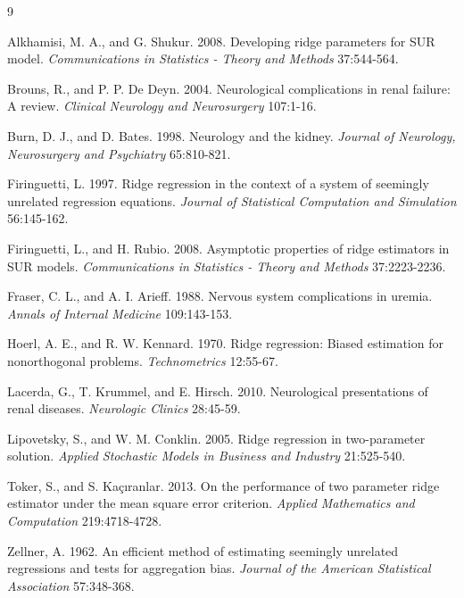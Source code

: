 \documentclass[twoside]{article}
\begin{document}

\begin{thebibliography}{9}

Alkhamisi, M. A., and G. Shukur. 2008. Developing ridge parameters for SUR model. {\it Communications in Statistics - Theory and Methods} 37:544-564.

Brouns, R., and P. P. De Deyn. 2004. Neurological complications in renal failure: A review. {\it Clinical Neurology and Neurosurgery} 107:1-16.

Burn, D. J., and D. Bates. 1998. Neurology and the kidney. {\it Journal of Neurology, Neurosurgery and Psychiatry} 65:810-821.

Firinguetti, L. 1997. Ridge regression in the context of a system of seemingly unrelated regression equations. {\it Journal of Statistical Computation and Simulation} 56:145-162.

Firinguetti, L., and H. Rubio. 2008. Asymptotic properties of ridge estimators in SUR models. {\it Communications in Statistics - Theory and Methods} 37:2223-2236.

Fraser, C. L., and A. I. Arieff. 1988. Nervous system complications in uremia. {\it Annals of Internal Medicine} 109:143-153.

Hoerl, A. E., and R. W. Kennard. 1970. Ridge regression: Biased estimation for nonorthogonal problems. {\it Technometrics} 12:55-67.

Lacerda, G., T. Krummel, and E. Hirsch. 2010. Neurological presentations of renal diseases. {\it Neurologic Clinics} 28:45-59.

Lipovetsky, S., and W. M. Conklin. 2005. Ridge regression in two-parameter solution. {\it Applied Stochastic Models in Business and Industry} 21:525-540.

Toker, S., and S. Ka\c{c}{\i}ranlar. 2013. On the performance of two parameter ridge estimator under the mean square error criterion. {\it Applied Mathematics and Computation} 219:4718-4728.

Zellner, A. 1962. An efficient method of estimating seemingly unrelated regressions and tests for aggregation bias. {\it Journal of the American Statistical Association} 57:348-368.

\end{thebibliography}
\end{document}
